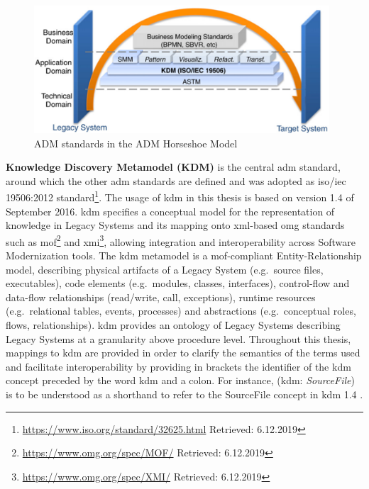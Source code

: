 \begin{figure}[hbt]
\hypertarget{fig:adm-horseshoe-b}{%
\centering%
\includegraphics[width=0.98\textwidth]{../figures/adm_horseshoe_2.png}%
\caption[ADM standards in the ADM Horseshoe Model]{ADM standards in the ADM Horseshoe Model \autocite{Perez-Castillo2011KDM}}%
\label{fig:adm-horseshoe-b}%
}
\end{figure}

\textbf{Knowledge Discovery Metamodel (KDM)} \autocite{OMG2016KDM} is the central \gls{adm} standard, around which the other \gls{adm} standards are defined \autocite{Perez-Castillo2011KDM} and
was adopted as \gls{iso}/\gls{iec} 19506:2012 standard\footnote{\url{https://www.iso.org/standard/32625.html} Retrieved: 6.12.2019}.
The usage of \gls{kdm} in this thesis is based on version 1.4 of September 2016.
\gls{kdm} specifies a conceptual model for the representation of knowledge in \glspl{Legacy System} and its mapping onto \gls{xml}-based \gls{omg} standards such as \gls{mof}\footnote{\url{https://www.omg.org/spec/MOF/} Retrieved: 6.12.2019} and \gls{xmi}\footnote{\url{https://www.omg.org/spec/XMI/} Retrieved: 6.12.2019}, allowing integration and interoperability across \gls{Software Modernization} tools.
The \gls{kdm} \gls{metamodel} is a \gls{mof}-compliant Entity-Relationship model, describing physical \glspl{artifact} of a \gls{Legacy System} (e.g.~source files, executables), code elements (e.g.~modules, classes, interfaces), control-flow and data-flow relationships (read/write, call, exceptions), runtime resources (e.g.~relational tables, events, processes) and abstractions (e.g.~conceptual roles, flows, relationships).
\gls{kdm} provides an ontology of \glspl{Legacy System} \autocite{Perez-Castillo2011KDM} describing \glspl{Legacy System} at a granularity above procedure level.
Throughout this thesis, mappings to \gls{kdm} are provided in order to clarify the semantics of the terms used and facilitate interoperability by providing in brackets the identifier of the \gls{kdm} concept preceded by the word \gls{kdm} and a colon.
For instance, (\gls{kdm}: \emph{SourceFile}) is to be understood as a shorthand to refer to the SourceFile concept in \gls{kdm} 1.4 \autocite{OMG2016KDM}.


